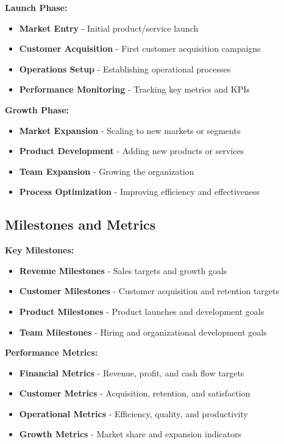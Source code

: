 \documentclass[12pt]{article}
\begin{document}
\textbf{Launch Phase:}
\begin{itemize}
    \item \textbf{Market Entry} - Initial product/service launch
    \item \textbf{Customer Acquisition} - First customer acquisition campaigns
    \item \textbf{Operations Setup} - Establishing operational processes
    \item \textbf{Performance Monitoring} - Tracking key metrics and KPIs
\end{itemize}

\textbf{Growth Phase:}
\begin{itemize}
    \item \textbf{Market Expansion} - Scaling to new markets or segments
    \item \textbf{Product Development} - Adding new products or services
    \item \textbf{Team Expansion} - Growing the organization
    \item \textbf{Process Optimization} - Improving efficiency and effectiveness
\end{itemize}

\subsection{Milestones and Metrics}

\textbf{Key Milestones:}
\begin{itemize}
    \item \textbf{Revenue Milestones} - Sales targets and growth goals
    \item \textbf{Customer Milestones} - Customer acquisition and retention targets
    \item \textbf{Product Milestones} - Product launches and development goals
    \item \textbf{Team Milestones} - Hiring and organizational development goals
\end{itemize}

\textbf{Performance Metrics:}
\begin{itemize}
    \item \textbf{Financial Metrics} - Revenue, profit, and cash flow targets
    \item \textbf{Customer Metrics} - Acquisition, retention, and satisfaction
    \item \textbf{Operational Metrics} - Efficiency, quality, and productivity
    \item \textbf{Growth Metrics} - Market share and expansion indicators
\end{itemize}
\end{document}
